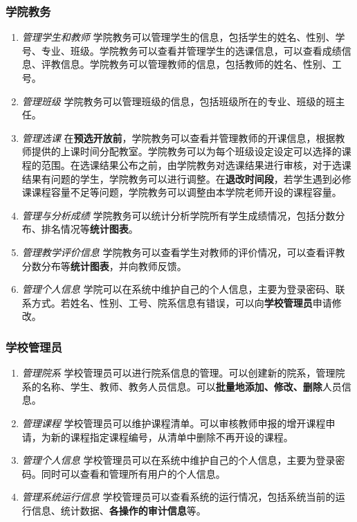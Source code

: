 \subsubsection{学院教务}
\begin{enumerate}
    \item \textit{管理学生和教师} \quad 学院教务可以管理学生的信息，包括学生的姓名、性别、学号、专业、班级。学院教务可以查看并管理学生的选课信息，可以查看成绩信息、评教信息。学院教务可以管理教师的信息，包括教师的姓名、性别、工号。
    \item \textit{管理班级} \quad 学院教务可以管理班级的信息，包括班级所在的专业、班级的班主任。
    \item \textit{管理选课} \quad 在\textbf{预选开放前}，学院教务可以查看并管理教师的开课信息，根据教师提供的上课时间分配教室。学院教务可以为每个班级设定设定可以选择的课程的范围。在选课结果公布之前，由学院教务对选课结果进行审核，对于选课结果有问题的学生，学院教务可以进行调整。在\textbf{退改时间段}，若学生遇到必修课课程容量不足等问题，学院教务可以调整由本学院老师开设的课程容量。
    \item \textit{管理与分析成绩} \quad 学院教务可以统计分析学院所有学生成绩情况，包括分数分布、排名情况等\textbf{统计图表}。
    \item \textit{管理教学评价信息} \quad 学院教务可以查看学生对教师的评价情况，可以查看评教分数分布等\textbf{统计图表}，并向教师反馈。
    \item \textit{管理个人信息} \quad 学院可以在系统中维护自己的个人信息，主要为登录密码、联系方式。若姓名、性别、工号、院系信息有错误，可以向\textbf{学校管理员}申请修改。
\end{enumerate}

\subsubsection{学校管理员}
\begin{enumerate}
    \item \textit{管理院系} \quad 学校管理员可以进行院系信息的管理。可以创建新的院系，管理院系的名称、学生、教师、教务人员信息。可以\textbf{批量地添加、修改、删除}人员信息。
    \item \textit{管理课程} \quad 学校管理员可以维护课程清单。可以审核教师申报的增开课程申请，为新的课程指定课程编号，从清单中删除不再开设的课程。
    \item \textit{管理个人信息} \quad 学校管理员可以在系统中维护自己的个人信息，主要为登录密码。同时可以查看和管理所有用户的个人信息。
    \item \textit{管理系统运行信息} \quad 学校管理员可以查看系统的运行情况，包括系统当前的运行信息、统计数据、\textbf{各操作的审计信息}等。
\end{enumerate}
